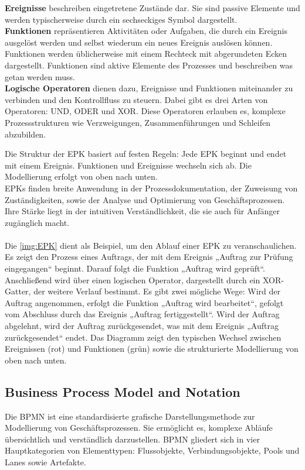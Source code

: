 \textbf{Ereignisse} beschreiben eingetretene Zustände dar. Sie sind passive Elemente und werden typischerweise durch ein sechseckiges Symbol dargestellt.\\
\textbf{Funktionen} repräsentieren Aktivitäten oder Aufgaben, die durch ein Ereignis ausgelöst werden und selbst wiederum ein neues Ereignis auslösen können. Funktionen werden üblicherweise mit einem Rechteck mit abgerundeten Ecken dargestellt. Funktionen sind aktive Elemente des Prozesses und beschreiben was getan werden muss. \\
\textbf{Logische Operatoren} dienen dazu, Ereignisse und Funktionen miteinander zu verbinden und den Kontrollfluss zu steuern. Dabei gibt es drei Arten von Operatoren: UND, ODER und \ac{XOR}. Diese Operatoren erlauben es, komplexe Prozessstrukturen wie Verzweigungen, Zusammenführungen und Schleifen abzubilden.

Die Struktur der \ac{EPK} basiert auf festen Regeln: Jede \ac{EPK} beginnt und endet mit einem Ereignis. Funktionen und Ereignisse wechseln sich ab. Die Modellierung erfolgt von oben nach unten.\\
\ac{EPK}s finden breite Anwendung in der Prozessdokumentation, der Zuweisung von Zuständigkeiten, sowie der Analyse und Optimierung von Geschäftsprozessen. Ihre Stärke liegt in der intuitiven Verständlichkeit, die sie auch für Anfänger zugänglich macht.\\
\\
\newpage
Die \autoref{img:EPK} dient als Beispiel, um den Ablauf einer \ac{EPK} zu veranschaulichen. Es zeigt den Prozess eines Auftrags, der mit dem Ereignis „Auftrag zur Prüfung eingegangen“ beginnt.
Darauf folgt die Funktion „Auftrag wird geprüft“. Anschließend wird über einen logischen Operator, dargestellt durch ein \ac{XOR}-Gatter, der weitere Verlauf bestimmt.
Es gibt zwei mögliche Wege: Wird der Auftrag angenommen, erfolgt die Funktion „Auftrag wird bearbeitet“, gefolgt vom Abschluss durch das Ereignis „Auftrag fertiggestellt“. Wird der Auftrag abgelehnt, wird der Auftrag zurückgesendet, was mit dem Ereignis „Auftrag zurückgesendet“ endet. Das Diagramm zeigt den typischen Wechsel zwischen Ereignissen (rot) und Funktionen (grün) sowie die strukturierte Modellierung von oben nach unten.

\newpage
\subsection{Business Process Model and Notation}
Die \ac{BPMN} ist eine standardisierte grafische Darstellungsmethode zur Modellierung von Geschäftsprozessen. Sie ermöglicht es, komplexe Abläufe übersichtlich und verständlich darzustellen. \ac{BPMN} gliedert sich in vier Hauptkategorien von Elementtypen: Flussobjekte, Verbindungsobjekte, Pools und Lanes sowie Artefakte.

